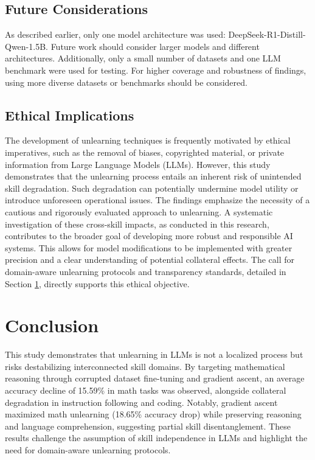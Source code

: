 \documentclass[10pt]{article}
\begin{document}
\subsection{Future Considerations}
As described earlier, only one model architecture was used: DeepSeek-R1-Distill-Qwen-1.5B. Future work should consider larger models and different architectures. Additionally, only a small number of datasets and one LLM benchmark were used for testing. For higher coverage and robustness of findings, using more diverse datasets or benchmarks should be considered.

\subsection{Ethical Implications}
The development of unlearning techniques is frequently motivated by ethical imperatives, such as the removal of biases, copyrighted material, or private information from Large Language Models (LLMs). However, this study demonstrates that the unlearning process entails an inherent risk of unintended skill degradation. Such degradation can potentially undermine model utility or introduce unforeseen operational issues. The findings emphasize the necessity of a cautious and rigorously evaluated approach to unlearning. A systematic investigation of these cross-skill impacts, as conducted in this research, contributes to the broader goal of developing more robust and responsible AI systems. This allows for model modifications to be implemented with greater precision and a clear understanding of potential collateral effects. The call for domain-aware unlearning protocols and transparency standards, detailed in Section \ref{sec:conclusion}, directly supports this ethical objective.

\section{Conclusion}
\label{sec:conclusion}
This study demonstrates that unlearning in LLMs is not a localized process but risks destabilizing interconnected skill domains. By targeting mathematical reasoning through corrupted dataset fine-tuning and gradient ascent, an average accuracy decline of 15.59\% in math tasks was observed, alongside collateral degradation in instruction following and coding. Notably, gradient ascent maximized math unlearning (18.65\% accuracy drop) while preserving reasoning and language comprehension, suggesting partial skill disentanglement. These results challenge the assumption of skill independence in LLMs and highlight the need for domain-aware unlearning protocols.
\end{document}
